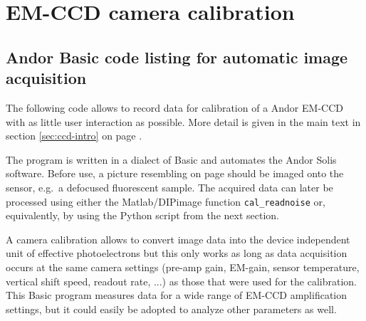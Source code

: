 \chapter{EM-CCD camera calibration}
\section{Andor Basic code listing for automatic image acquisition}
\label{sec:basic-acquisition}


The following code allows to record data for calibration of a Andor
EM-CCD with as little user interaction as possible. More detail is
given in the main text in section \ref{sec:ccd-intro} on page
\pageref{sec:ccd-intro}.

The program is written in a dialect of Basic and automates the Andor Solis software.
Before use, a picture resembling
 on page \pageref{fig:shot-noise} should be
imaged onto the sensor, e.g.\ a defocused fluorescent sample. The
acquired data can later be processed using either the Matlab/DIPimage
function \verb!cal_readnoise! or, equivalently, by using the Python
script from the next section.

A camera calibration allows to convert image data into the device
independent unit of effective photoelectrons but this only works as
long as data acquisition occurs at the same camera settings (pre-amp
gain, EM-gain, sensor temperature, vertical shift speed, readout rate,
...) as those that were used for the calibration. This Basic program
measures data for a wide range of EM-CCD amplification settings, but
it could easily be adopted to analyze other parameters as well.

